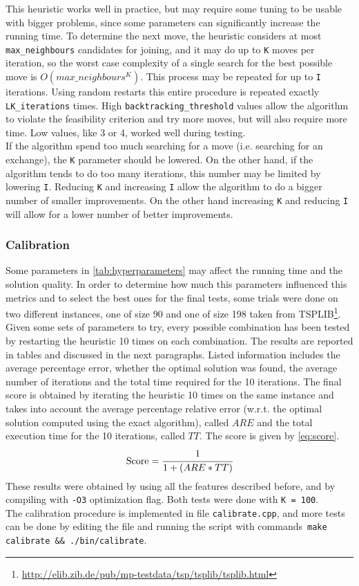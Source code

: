 This heuristic works well in practice, but may require some tuning to be usable with bigger problems, since some parameters can significantly increase the running time. To determine the next move, the heuristic considers at most \texttt{max\_neighbours} candidates for joining, and it may do up to \texttt{K} moves per iteration, so the worst case complexity of a single search for the best possible move is $O(max\_neighbours^K)$. This process may be repeated for up to \texttt{I} iterations. Using random restarts this entire procedure is repeated exactly \texttt{LK\_iterations} times. High \texttt{backtracking\_threshold} values allow the algorithm to violate the feasibility criterion and try more moves, but will also require more time. Low values, like 3 or 4, worked well during testing.\\
If the algorithm spend too much searching for a move (i.e. searching for an exchange), the \texttt{K} parameter should be lowered. On the other hand, if the algorithm tends to do too many iterations, this number may be limited by lowering \texttt{I}. Reducing \texttt{K} and increasing \texttt{I} allow the algorithm to do a bigger number of smaller improvements. On the other hand increasing \texttt{K} and reducing \texttt{I} will allow for a lower number of better improvements.

\subsubsection{Calibration}
Some parameters in \cref{tab:hyperparameters} may affect the running time and the solution quality. In order to determine how much this parameters influenced this metrics and to select the best ones for the final tests, some trials were done on two different instances, one of size 90 and one of size 198 taken from TSPLIB\footnote{\url{http://elib.zib.de/pub/mp-testdata/tsp/tsplib/tsplib.html}}. Given some sets of parameters to try, every possible combination has been tested by restarting the heuristic 10 times on each combination. The results are reported in tables and discussed in the next paragraphs. Listed information includes the average percentage error, whether the optimal solution was found, the average number of iterations and the total time required for the 10 iterations. The final score is obtained by iterating the heuristic 10 times on the same instance and takes into account the average percentage relative error (w.r.t. the optimal solution computed using the exact algorithm), called $ARE$ and the total execution time for the 10 iterations, called $TT$. The score is given by \cref{eq:score}.
\begin{equation}
	\text{Score} = \cfrac{1}{1 + (ARE * TT)}
	\label{eq:score}
\end{equation}
These results were obtained by using all the features described before, and by compiling with \texttt{-O3} optimization flag. Both tests were done with \texttt{K = 100}.\\
The calibration procedure is implemented in file \texttt{calibrate.cpp}, and more tests can be done by editing the file and running the script with commands~\texttt{make calibrate \&\& ./bin/calibrate}.

